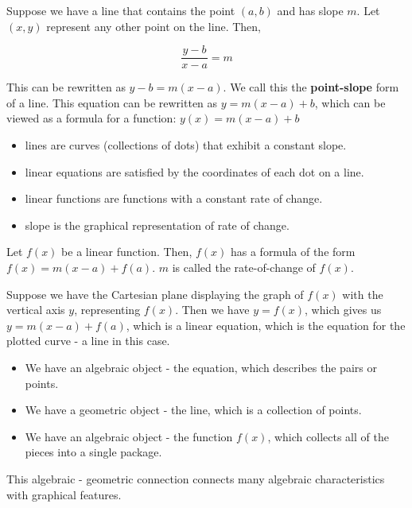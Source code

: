 \documentclass{ximera}
\begin{document}
Suppose we have a line that contains the point $(a,b)$ and has slope $m$.  Let $(x,y)$ represent any other point on the line.  Then,



\[
\frac{y-b}{x-a} = m
\]

This can be rewritten as $y - b = m(x - a)$. We call this the \textbf{\textcolor{purple!85!blue}{point-slope}} form of a line.  This equation can be rewritten as $y = m(x - a) + b$, which can be viewed as a formula for a function: $y(x) = m(x - a) + b$ 




\begin{itemize}
\item lines are curves (collections of dots) that exhibit a constant slope.
\item linear equations are satisfied by the coordinates of each dot on a line.
\item linear functions are functions with a constant rate of change.
\item slope is the graphical representation of rate of change.
\end{itemize}
















Let $f(x)$ be a linear function.  Then, $f(x)$ has a formula of the form $f(x) = m(x-a) + f(a)$.  $m$ is called the rate-of-change of $f(x)$.


Suppose we have the Cartesian plane displaying the graph of $f(x)$ with the vertical axis $y$, representing $f(x)$.  Then we have $y = f(x)$, which gives us $y = m(x-a) + f(a)$, which is a linear equation, which is the equation for the plotted curve - a line in this case.

\begin{itemize}
\item We have an algebraic object - the equation, which describes the pairs or points. 
\item We have a geometric object - the line, which is a collection of points. 
\item We have an algebraic object - the function $f(x)$, which collects all of the pieces into a single package. 
\end{itemize}


This algebraic - geometric connection connects many algebraic characteristics with graphical features.
\end{document}

